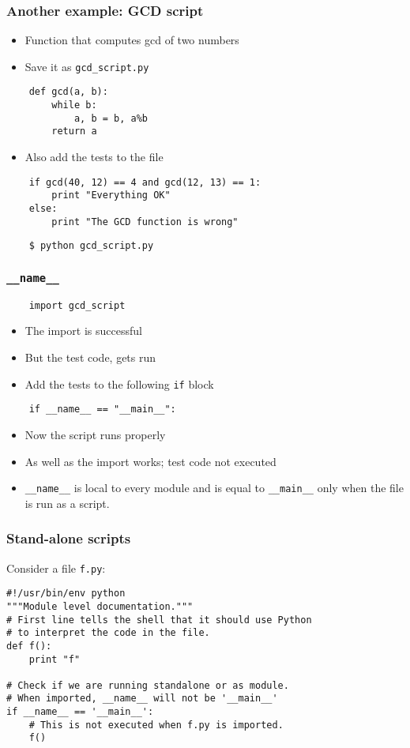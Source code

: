 \documentclass[12pt,presentation]{beamer}
\begin{document}
\begin{frame}[fragile]
  \frametitle{Another example: GCD script}
  \begin{itemize}
  \item Function that computes gcd of two numbers
  \item Save it as \texttt{gcd\_script.py}
  \end{itemize}
  \begin{lstlisting}
    def gcd(a, b):
        while b:
            a, b = b, a%b
        return a
  \end{lstlisting}
  \begin{itemize}
  \item Also add the tests to the file
  \end{itemize}
  \begin{lstlisting}
    if gcd(40, 12) == 4 and gcd(12, 13) == 1:
        print "Everything OK"
    else:
        print "The GCD function is wrong"
  \end{lstlisting}
  \begin{lstlisting}
    $ python gcd_script.py
  \end{lstlisting} %
\end{frame}

\begin{frame}[fragile]
  \frametitle{\texttt{\_\_name\_\_}}
  \begin{lstlisting}
    import gcd_script
  \end{lstlisting}
  \begin{itemize}
  \item The import is successful
  \item But the test code, gets run
  \item Add the tests to the following \texttt{if} block
  \end{itemize}
  \begin{lstlisting}
    if __name__ == "__main__":
  \end{lstlisting}
  \begin{itemize}
  \item Now the script runs properly 
  \item As well as the import works; test code not executed
  \item \texttt{\_\_name\_\_} is local to every module and is equal
    to \texttt{\_\_main\_\_} only when the file is run as a script.
  \end{itemize}
\end{frame}


\begin{frame}[fragile]
  \frametitle{Stand-alone scripts}
Consider a file \texttt{f.py}:
\footnotesize
\begin{lstlisting}
#!/usr/bin/env python
"""Module level documentation."""
# First line tells the shell that it should use Python
# to interpret the code in the file.
def f():
    print "f"

# Check if we are running standalone or as module.
# When imported, __name__ will not be '__main__'
if __name__ == '__main__':
    # This is not executed when f.py is imported.
    f() 
\end{lstlisting}
\end{frame}
\end{document}
